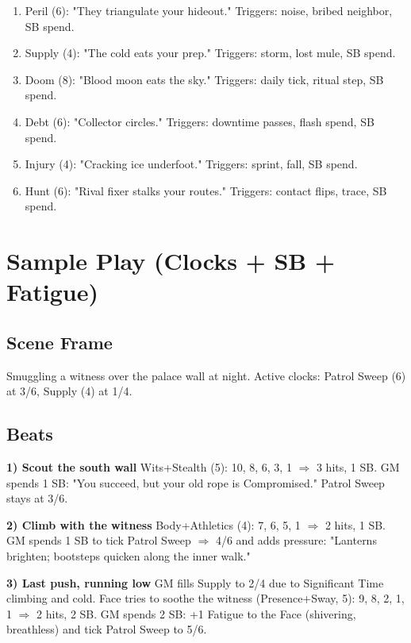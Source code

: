 \begin{enumerate}
\item Peril (6): "They triangulate your hideout." Triggers: noise, bribed neighbor, SB spend.
\item Supply (4): "The cold eats your prep." Triggers: storm, lost mule, SB spend.
\item Doom (8): "Blood moon eats the sky." Triggers: daily tick, ritual step, SB spend.
\item Debt (6): "Collector circles." Triggers: downtime passes, flash spend, SB spend.
\item Injury (4): "Cracking ice underfoot." Triggers: sprint, fall, SB spend.
\item Hunt (6): "Rival fixer stalks your routes." Triggers: contact flips, trace, SB spend.
\end{enumerate}

\section{Sample Play (Clocks + SB + Fatigue)}

\subsection{Scene Frame}
Smuggling a witness over the palace wall at night. Active clocks: Patrol Sweep (6) at 3/6, Supply (4) at 1/4.

\subsection{Beats}

\textbf{1) Scout the south wall} Wits+Stealth (5): 10, 8, 6, 3, 1 $\Rightarrow$ 3 hits, 1 SB. GM spends 1 SB: "You succeed, but your old rope is Compromised." Patrol Sweep stays at 3/6.

\textbf{2) Climb with the witness} Body+Athletics (4): 7, 6, 5, 1 $\Rightarrow$ 2 hits, 1 SB. GM spends 1 SB to tick Patrol Sweep $\Rightarrow$ 4/6 and adds pressure: "Lanterns brighten; bootsteps quicken along the inner walk."

\textbf{3) Last push, running low} GM fills Supply to 2/4 due to Significant Time climbing and cold. Face tries to soothe the witness (Presence+Sway, 5): 9, 8, 2, 1, 1 $\Rightarrow$ 2 hits, 2 SB. GM spends 2 SB: +1 Fatigue to the Face (shivering, breathless) and tick Patrol Sweep to 5/6.


